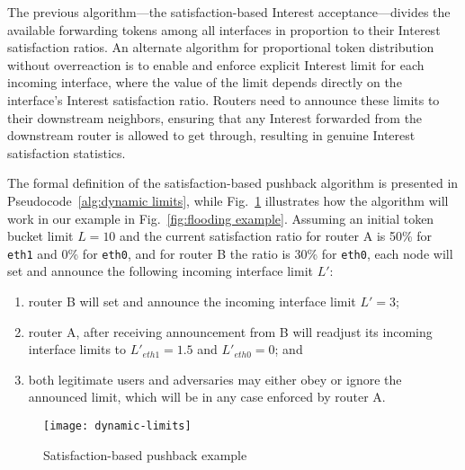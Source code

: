 The previous algorithm---the satisfaction-based Interest acceptance---divides the available forwarding tokens among all interfaces in proportion to their Interest satisfaction ratios.
An alternate algorithm for proportional token distribution without overreaction is to enable and enforce explicit Interest limit for each incoming interface, where the value of the limit depends directly on the interface's Interest satisfaction ratio.
Routers need to announce these limits to their downstream neighbors, ensuring that any Interest forwarded from the downstream router is allowed to get through, resulting in genuine Interest satisfaction statistics.

The formal definition of the satisfaction-based pushback algorithm is presented in Pseudocode~\ref{alg:dynamic limits}, while Fig.~\ref{fig:dynamic limits example} illustrates how the algorithm will work in our example in Fig.~\ref{fig:flooding example}.
Assuming an initial token bucket limit $L=10$ and the current satisfaction ratio for router A is 50\% for \texttt{eth1} and 0\% for \texttt{eth0}, and for router B the ratio is 30\% for \texttt{eth0}, each node will set and announce the following  incoming interface limit $L'$: 
\begin{enumerate}
\item router B will set and announce the incoming interface limit $L'=3$;
\item router A, after receiving announcement from B will readjust its incoming interface limits to $L'_{eth1} = 1.5$ and $L'_{eth0} = 0$; and
\item both legitimate users and adversaries may either obey or ignore the announced limit, which will be in any case enforced by router A.
\end{enumerate}


\begin{figure}[htbp]
  \centering
  \texttt{[image: dynamic-limits]}
  \vspace{-0.3cm}
  \caption{Satisfaction-based pushback example
}
  \label{fig:dynamic limits example}
\end{figure}



